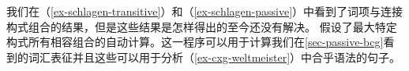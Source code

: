 我们在（\ref{ex-schlagen-transitive}）和（\ref{ex-schlagen-passive}）中看到了词项与连接构式组合的结果，但是这些结果是怎样得出的至今还没有解决。 \citet{Kay2002a}假设了最大特定构式所有相容组合的自动计算。这一程序可以用于计算我们在\ref{sec-passive-bcg}看到的词汇表征并且这些可以用于分析（\ref{ex-cxg-weltmeister}）中合乎语法的句子。

